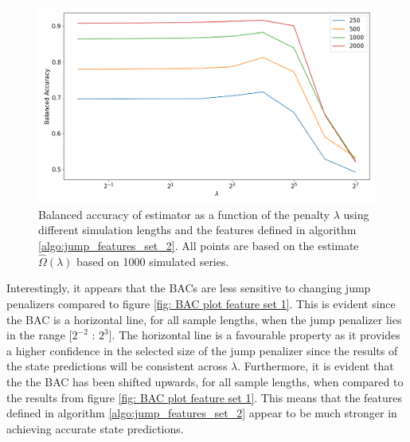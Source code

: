 \begin{figure}[H] 
    \centering
    \includegraphics[width=1\textwidth]{analysis/model_convergence/images/jump_penalties_feature_set_2.png}
    \caption[Balanced accuracy of the \jump estimator using feature set 2]{Balanced accuracy of \jump estimator as a function of the penalty $\lambda$ using different simulation lengths and the features defined in algorithm \ref{algo:jump_features_set_2}. All points are based on the estimate $\hat{\Omega} (\lambda)$ based on 1000 simulated series.}
    \label{fig: BAC plot feature set 2}
\end{figure}

Interestingly, it appears that the BACs are less sensitive to changing jump penalizers compared to figure \ref{fig: BAC plot feature set 1}. This is evident since the BAC is a horizontal line, for all sample lengths, when the jump penalizer lies in the range [$2^{-2}$ : $2^3$]. The horizontal line is a favourable property as it provides a higher confidence in the selected size of the jump penalizer since the results of the state predictions will be consistent across $\lambda$. Furthermore, it is evident that the the BAC has been shifted upwards, for all sample lengths, when compared to the results from figure \ref{fig: BAC plot feature set 1}. This means that the features defined in algorithm \ref{algo:jump_features_set_2} appear to be much stronger in achieving accurate state predictions. 

